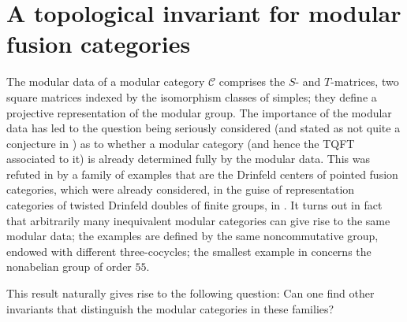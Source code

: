 \documentclass[a4paper, 10pt]{book}
\theoremstyle{definition}
\numberwithin{equation}{chapter}
\newcommand\C{\mathcal C}
\begin{document}
\chapter{A topological invariant for modular fusion categories}\label{chp3}
The modular data of a modular category $\C$ comprises the $S$- and $T$-matrices, two square matrices indexed by the isomorphism classes of simples; they define a projective representation of the modular group. The importance of the modular data has led to the question being seriously considered (and stated as not quite a conjecture in \cite{BNRW}) as to whether a modular category (and hence the TQFT associated to it) is already determined fully by the modular data. This was refuted in \cite{2017arXiv170802796M} by a family of examples that are the Drinfeld centers of pointed fusion categories, which were already considered, in the guise of representation categories of twisted Drinfeld doubles of finite groups, in \cite{DijPasRoc:QHAGCOM}. It turns out in fact that arbitrarily many inequivalent modular categories can give rise to the same modular data; the examples are defined by the same noncommutative group, endowed with different three-cocycles; the smallest example in \cite{2017arXiv170802796M} concerns the nonabelian group of order $55$.

This result naturally gives rise to the following question: Can one find other invariants that distinguish the modular categories in these families? 
\end{document}
